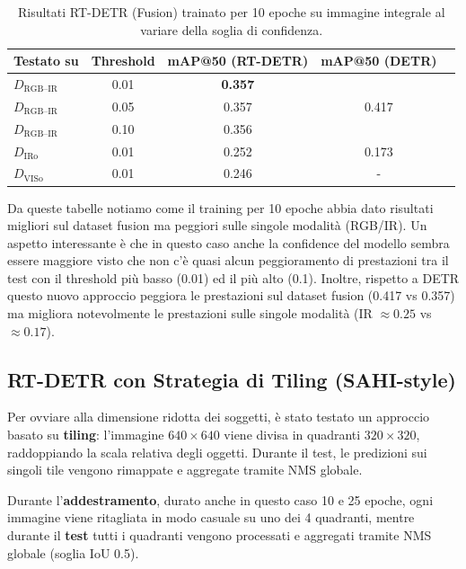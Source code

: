 \documentclass[a4paper,11pt]{article}
\begin{document}
\begin{table}[h]
\centering
\caption{Risultati RT-DETR (Fusion) trainato per 10 epoche su immagine integrale al variare della soglia di confidenza.}
\label{tab:rtdetr_base_10}
\begin{tabular}{lcccc}
\toprule
Testato su & Threshold & mAP@50 (RT-DETR) & mAP@50 (DETR) \\
\midrule
$D_{\text{RGB--IR}}$ & 0.01 & \textbf{0.357} & \multirow{3}{*}{0.417} \\
$D_{\text{RGB--IR}}$ & 0.05 & 0.357 & \\
$D_{\text{RGB--IR}}$ & 0.10 & 0.356 & \\
\midrule
$D_{\text{IRo}}$ & 0.01 & 0.252 & 0.173 \\
$D_{\text{VISo}}$ & 0.01 & 0.246 & - \\
\bottomrule
\end{tabular}
\end{table}

Da queste tabelle notiamo come il training per 10 epoche abbia dato risultati migliori sul dataset fusion ma peggiori sulle singole modalità (RGB/IR). Un aspetto interessante è che in questo caso anche la confidence del modello sembra essere maggiore visto che non c'è quasi alcun peggioramento di prestazioni tra il test con il threshold più basso (0.01) ed il più alto (0.1).
Inoltre, rispetto a DETR questo nuovo approccio peggiora le prestazioni sul dataset fusion (0.417 vs 0.357) ma migliora notevolmente le prestazioni sulle singole modalità (IR $\approx 0.25$ vs $\approx 0.17$).

\newpage

\subsection*{RT-DETR con Strategia di Tiling (SAHI-style)}
Per ovviare alla dimensione ridotta dei soggetti, è stato testato un approccio basato su \textbf{tiling}: l'immagine $640 \times 640$ viene divisa in quadranti $320 \times 320$, raddoppiando la scala relativa degli oggetti. Durante il test, le predizioni sui singoli tile vengono rimappate e aggregate tramite NMS globale.

Durante l'\textbf{addestramento}, durato anche in questo caso 10 e 25 epoche, ogni immagine viene ritagliata in modo casuale su uno dei 4 quadranti, mentre durante il \textbf{test} tutti i quadranti vengono processati e aggregati tramite NMS globale (soglia IoU 0.5).
\end{document}
